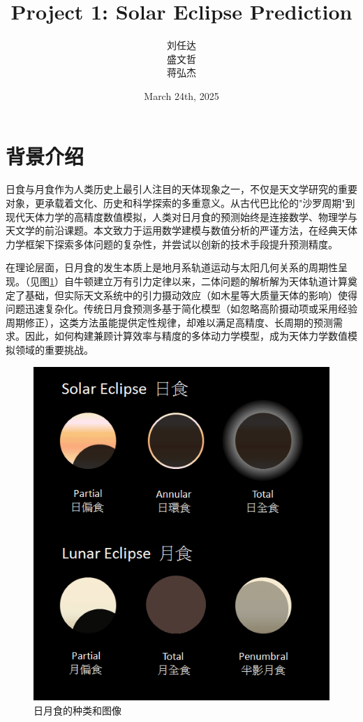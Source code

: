 \documentclass[hidelinks]{article}
\title{\textbf{Project 1: Solar Eclipse Prediction}}
\author{刘任达\\盛文哲\\蒋弘杰}
\date{March 24th, 2025}
\begin{document}
\hypersetup{bookmarksnumbered=true,}
\maketitle
\setcounter{tocdepth}{2}
\begin{Large}
\tableofcontents
\end{Large}%
\pagebreak

\section{背景介绍}

日食与月食作为人类历史上最引人注目的天体现象之一，不仅是天文学研究的重要对象，更承载着文化、历史和科学探索的多重意义。从古代巴比伦的"沙罗周期"到现代天体力学的高精度数值模拟，人类对日月食的预测始终是连接数学、物理学与天文学的前沿课题。本文致力于运用数学建模与数值分析的严谨方法，在经典天体力学框架下探索多体问题的复杂性，并尝试以创新的技术手段提升预测精度。

在理论层面，日月食的发生本质上是地月系轨道运动与太阳几何关系的周期性呈现。（见图\ref{fig:eclipse}）自牛顿建立万有引力定律以来，二体问题的解析解为天体轨道计算奠定了基础，但实际天文系统中的引力摄动效应（如木星等大质量天体的影响）使得问题迅速复杂化。传统日月食预测多基于简化模型（如忽略高阶摄动项或采用经验周期修正），这类方法虽能提供定性规律，却难以满足高精度、长周期的预测需求。因此，如何构建兼顾计算效率与精度的多体动力学模型，成为天体力学数值模拟领域的重要挑战。

\begin{figure}[htbp]
    \centering
    \includegraphics[width=0.5\linewidth]{images/ecltype.png}
    \caption{日月食的种类和图像}
    \label{fig:eclipse}
\end{figure}
\end{document}
